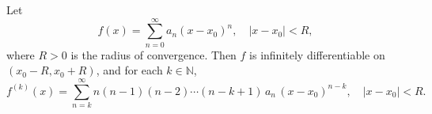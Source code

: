 Let
$$f(x) = \sum_{n=0}^{\infty} a_n(x - x_0)^n, \quad |x - x_0| < R,$$
where $R > 0$ is the radius of convergence. Then $f$ is infinitely differentiable on $(x_0 - R, x_0 + R)$, and for each $k \in \mathbb{N}$,
$$f^{(k)}(x) = \sum_{n=k}^{\infty} n(n-1)(n-2) \cdots (n-k+1)\,a_n\,(x - x_0)^{n-k}, \quad |x - x_0| < R.$$
